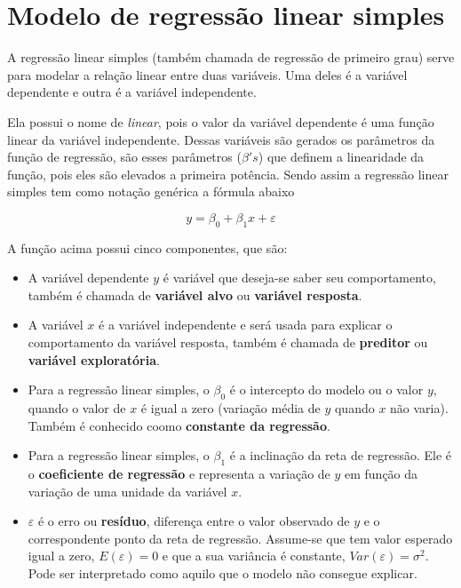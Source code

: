 \chapter{Modelo de regressão linear simples}
\label{ch:modelo_regressao}

\noindent A regressão linear simples (também chamada de regressão de primeiro grau) serve para modelar a relação linear entre duas variáveis. Uma deles é a variável dependente e outra é a variável independente.

Ela possui o nome de \textit{linear}, pois o valor da variável dependente é uma função linear da variável independente. Dessas variáveis são gerados os parâmetros da função de regressão, são esses parâmetros ($\beta's$) que definem a linearidade da função, pois eles são elevados a primeira potência. Sendo assim a regressão linear  simples tem como notação genérica a fórmula abaixo

\begin{equation}\label{eq:eq21}
    y = \beta_0 + \beta_1 x + \varepsilon
\end{equation}

\noindent A função acima possui cinco componentes, que são:

\begin{itemize}
    \item A variável dependente $y$ é variável que deseja-se saber seu comportamento, também é chamada de \textbf{variável alvo} ou \textbf{variável resposta}.
    \item A variável $x$ é a variável independente e será usada para explicar o comportamento da variável resposta, também é chamada de \textbf{preditor} ou \textbf{variável exploratória}. 
    \item Para a regressão linear simples, o $\beta_0$ é o intercepto do modelo ou o valor $y$, quando o valor de $x$ é igual a zero (variação média de $y$ quando $x$ não varia). Também é conhecido coomo \textbf{constante da regressão}.
    \item Para a regressão linear simples, o $\beta_1$ é a inclinação da reta de regressão. Ele é o \textbf{coeficiente de regressão} e representa a variação de $y$ em função da variação de uma unidade da variável $x$.
    \item $\varepsilon$ é o erro ou \textbf{resíduo}, diferença entre o valor observado de $y$ e o correspondente ponto da reta de regressão. Assume-se que tem valor esperado igual a zero, $E(\varepsilon) = 0$ e que a sua variância é constante, $Var(\varepsilon) = \sigma^2$. Pode ser interpretado como aquilo que o modelo não consegue explicar.
\end{itemize}

